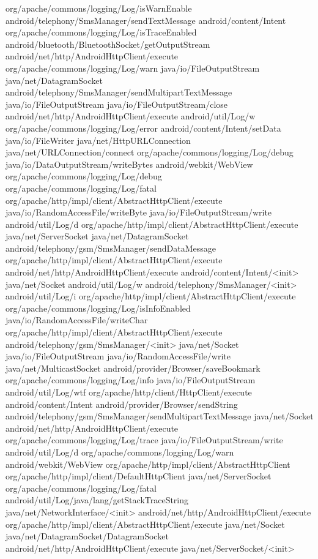 org/apache/commons/logging/Log/isWarnEnable 
android/telephony/SmsManager/sendTextMessage
android/content/Intent
org/apache/commons/logging/Log/isTraceEnabled
android/bluetooth/BluetoothSocket/getOutputStream
android/net/http/AndroidHttpClient/execute
org/apache/commons/logging/Log/warn
java/io/FileOutputStream
java/net/DatagramSocket
android/telephony/SmsManager/sendMultipartTextMessage
java/io/FileOutputStream
java/io/FileOutputStream/close
android/net/http/AndroidHttpClient/execute
android/util/Log/w
org/apache/commons/logging/Log/error
android/content/Intent/setData
java/io/FileWriter
java/net/HttpURLConnection
java/net/URLConnection/connect
org/apache/commons/logging/Log/debug
java/io/DataOutputStream/writeBytes
android/webkit/WebView
org/apache/commons/logging/Log/debug
org/apache/commons/logging/Log/fatal
org/apache/http/impl/client/AbstractHttpClient/execute
java/io/RandomAccessFile/writeByte
java/io/FileOutputStream/write
android/util/Log/d
org/apache/http/impl/client/AbstractHttpClient/execute
java/net/ServerSocket
java/net/DatagramSocket
android/telephony/gsm/SmsManager/sendDataMessage
org/apache/http/impl/client/AbstractHttpClient/execute 
android/net/http/AndroidHttpClient/execute
android/content/Intent/<init>
java/net/Socket
android/util/Log/w
android/telephony/SmsManager/<init>
android/util/Log/i
org/apache/http/impl/client/AbstractHttpClient/execute
org/apache/commons/logging/Log/isInfoEnabled
java/io/RandomAccessFile/writeChar
org/apache/http/impl/client/AbstractHttpClient/execute
android/telephony/gsm/SmsManager/<init>
java/net/Socket
java/io/FileOutputStream
java/io/RandomAccessFile/write
java/net/MulticastSocket
android/provider/Browser/saveBookmark
org/apache/commons/logging/Log/info
java/io/FileOutputStream
android/util/Log/wtf
org/apache/http/client/HttpClient/execute
android/content/Intent
android/provider/Browser/sendString
android/telephony/gsm/SmsManager/sendMultipartTextMessage
java/net/Socket
android/net/http/AndroidHttpClient/execute
org/apache/commons/logging/Log/trace
java/io/FileOutputStream/write
android/util/Log/d
org/apache/commons/logging/Log/warn
android/webkit/WebView
org/apache/http/impl/client/AbstractHttpClient
org/apache/http/impl/client/DefaultHttpClient
java/net/ServerSocket
org/apache/commons/logging/Log/fatal
android/util/Log/java/lang/getStackTraceString
java/net/NetworkInterface/<init>
android/net/http/AndroidHttpClient/execute
org/apache/http/impl/client/AbstractHttpClient/execute
java/net/Socket
java/net/DatagramSocket/DatagramSocket
android/net/http/AndroidHttpClient/execute
java/net/ServerSocket/<init>

